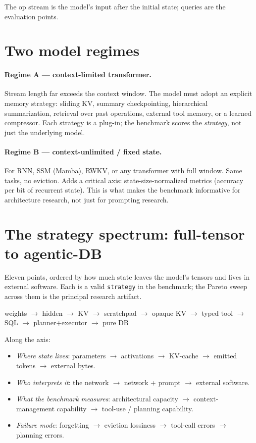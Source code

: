 \documentclass[11pt]{article}
\begin{document}
The op stream is the model's input after the initial state; queries are
the evaluation points.

\section{Two model regimes}
\label{sec:regimes}

\paragraph{Regime A --- context-limited transformer.}
Stream length far exceeds the context window. The model must adopt an
explicit memory strategy: sliding KV, summary checkpointing,
hierarchical summarization, retrieval over past operations, external
tool memory, or a learned compressor. Each strategy is a plug-in; the
benchmark scores the \emph{strategy}, not just the underlying model.

\paragraph{Regime B --- context-unlimited / fixed state.}
For RNN, SSM (Mamba), RWKV, or any transformer with full window. Same
tasks, no eviction. Adds a critical axis: state-size-normalized metrics
(accuracy per bit of recurrent state). This is what makes the benchmark
informative for architecture research, not just for prompting research.

\section{The strategy spectrum: full-tensor to agentic-DB}
\label{sec:spectrum}

Eleven points, ordered by how much state leaves the model's tensors and
lives in external software. Each is a valid \texttt{strategy} in the
benchmark; the Pareto sweep across them is the principal research
artifact.

\begin{center}
\small
weights $\rightarrow$ hidden $\rightarrow$ KV $\rightarrow$ scratchpad
$\rightarrow$ opaque KV $\rightarrow$ typed tool $\rightarrow$ SQL
$\rightarrow$ planner+executor $\rightarrow$ pure DB
\end{center}

Along the axis:

\begin{itemize}[leftmargin=*]
  \item \emph{Where state lives}: parameters $\to$ activations $\to$
    KV-cache $\to$ emitted tokens $\to$ external bytes.
  \item \emph{Who interprets it}: the network $\to$ network + prompt
    $\to$ external software.
  \item \emph{What the benchmark measures}: architectural capacity $\to$
    context-management capability $\to$ tool-use / planning capability.
  \item \emph{Failure mode}: forgetting $\to$ eviction lossiness $\to$
    tool-call errors $\to$ planning errors.
\end{itemize}
\end{document}
